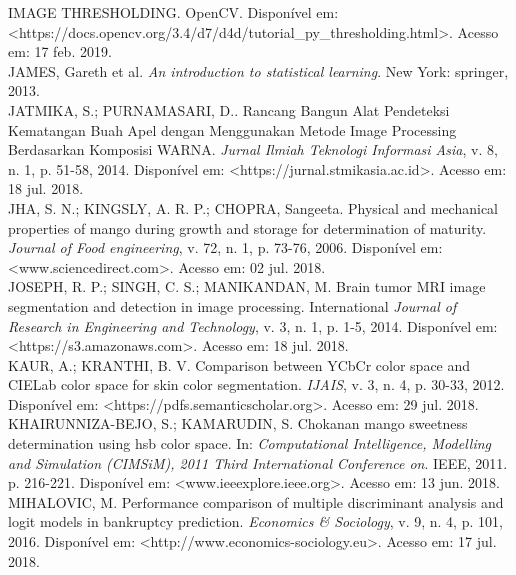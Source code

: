 \noindent IMAGE THRESHOLDING. OpenCV. Disponível em: <https://docs.opencv.org/3.4/d7/d4d/tutorial\_py\_thresholding.html>. Acesso em: 17 feb. 2019.
\\

\noindent JAMES, Gareth et al. \textit{An introduction to statistical learning}. New York: springer, 2013.
\\

\noindent JATMIKA, S.; PURNAMASARI, D.. Rancang Bangun Alat Pendeteksi Kematangan Buah Apel dengan Menggunakan Metode Image Processing Berdasarkan Komposisi WARNA. \textit{Jurnal Ilmiah Teknologi Informasi Asia}, v. 8, n. 1, p. 51-58, 2014. Disponível em: <https://jurnal.stmikasia.ac.id>. Acesso em: 18 jul. 2018.
\\

\noindent JHA, S. N.; KINGSLY, A. R. P.; CHOPRA, Sangeeta. Physical and mechanical properties of mango during growth and storage for determination of maturity. \textit{Journal of Food engineering}, v. 72, n. 1, p. 73-76, 2006. Disponível em: <www.sciencedirect.com>. Acesso em: 02 jul. 2018.
\\

\noindent JOSEPH, R. P.; SINGH, C. S.; MANIKANDAN, M. Brain tumor MRI image segmentation and detection in image processing. International \textit{Journal of Research in Engineering and Technology}, v. 3, n. 1, p. 1-5, 2014. Disponível em: <https://s3.amazonaws.com>. Acesso em: 18 jul. 2018.
\\

\noindent KAUR, A.; KRANTHI, B. V. Comparison between YCbCr color space and CIELab color space for skin color segmentation. \textit{IJAIS}, v. 3, n. 4, p. 30-33, 2012. Disponível em: <https://pdfs.semanticscholar.org>. Acesso em: 29 jul. 2018.
\\

\noindent KHAIRUNNIZA-BEJO, S.; KAMARUDIN, S. Chokanan mango sweetness determination using hsb color space. In: \textit{Computational Intelligence, Modelling and Simulation (CIMSiM), 2011 Third International Conference on}. IEEE, 2011. p. 216-221. Disponível em: <www.ieeexplore.ieee.org>. Acesso em: 13 jun. 2018.
\\

\noindent MIHALOVIC, M. Performance comparison of multiple discriminant analysis and logit models in bankruptcy prediction. \textit{Economics \& Sociology}, v. 9, n. 4, p. 101, 2016. Disponível em: <http://www.economics-sociology.eu>. Acesso em: 17 jul. 2018.
\\

